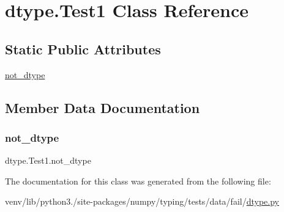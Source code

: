 \hypertarget{classdtype_1_1Test1}{}\section{dtype.\+Test1 Class Reference}
\label{classdtype_1_1Test1}
\subsection*{Static Public Attributes}
\begin{DoxyCompactItemize}
\item 
\hyperlink{classdtype_1_1Test1_a2de9d82f744fcc4c3a914daf27735d21}{not\+\_\+dtype}
\end{DoxyCompactItemize}


\subsection{Member Data Documentation}
\mbox{\label{classdtype_1_1Test1_a2de9d82f744fcc4c3a914daf27735d21}} 
\subsubsection{\texorpdfstring{not\+\_\+dtype}{not\_dtype}}
{\footnotesize\ttfamily dtype.\+Test1.\+not\+\_\+dtype\hspace{0.3cm}{\ttfamily [static]}}



The documentation for this class was generated from the following file\+:\begin{DoxyCompactItemize}
\item 
venv/lib/python3./site-\/packages/numpy/typing/tests/data/fail/\hyperlink{fail_2dtype_8py}{dtype.\+py}\end{DoxyCompactItemize}
